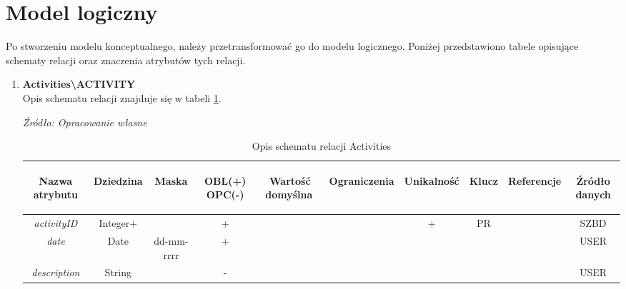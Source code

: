 \documentclass[12pt,oneside]{report}
\begin{document}
\section{Model logiczny}
Po stworzeniu modelu konceptualnego, należy przetransformować go do modelu logicznego. Poniżej przedstawiono tabele opisujące schematy relacji oraz znaczenia atrybutów tych relacji.
\begin{enumerate}[start=1,label={\bfseries REL\textbackslash0\arabic*}]
	\item \textbf{Activities\textbackslash ACTIVITY} \\
	Opis schematu relacji znajduje się w tabeli \ref{ActivityRelationSchema}.
	
	\begin{table}[H]
		\caption{Opis schematu relacji Activities}
		\textit{Źródło: Opracowanie własne}
		\label{ActivityRelationSchema}
		\centering
		\begin{tabular}{|c|c|c|c|c|c|c|c|c|c|}
			\hline
			\begin{sideways}Nazwa atrybutu\end{sideways}& 
			\begin{sideways}Dziedzina \end{sideways}& 
			\begin{sideways}Maska \end{sideways}& 
			\begin{sideways}OBL(+) OPC(-)\end{sideways} & 
			\begin{sideways}Wartość domyślna$\ $\end{sideways}& 
			\begin{sideways}Ograniczenia\end{sideways} &
			\begin{sideways}Unikalność \end{sideways}& 
			\begin{sideways}Klucz \end{sideways}& 
			\begin{sideways}Referencje \end{sideways}&
			\begin{sideways}Źródło danych\end{sideways}\\
			\hline
			\textit{activityID} & Integer+ & & + & & & + & PR & &SZBD\\
			\hline
			\textit{date} & Date & dd-mm-rrrr& + & & & & & &USER\\
			\hline
			\textit{description} & String & & - & & & & & &USER\\

\end{tabular}
\end{table}
\end{enumerate}
\end{document}
